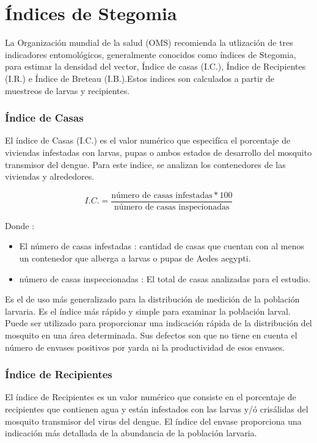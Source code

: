 \section{Índices de Stegomia}
\label{sec:densidad-vectorial-indices-stegomia}

La Organización mundial de la salud (OMS) recomienda la utlización de tres
indicadores entomológicos, generalmente conocidos como índices de Stegomia,
para estimar la densidad del vector, Índice de casas (I.C.), Índice de
Recipientes (I.R.) e Índice de Breteau (I.B.).Estos indices son calculados a
partir de muestreos de larvas y recipientes.

\subsubsection{Índice de Casas}
El índice de Casas (I.C.) es el valor numérico que especifíca el porcentaje
de viviendas infestadas con larvas, pupas o ambos estados de desarrollo
del mosquito transmisor del dengue. Para este indice, se analizan los
contenedores de las viviendas y alrededores.

\begin{equation}
I.C. = \frac{\text{número de casas infestadas} * 100}{\text{número de casas inspecionadas}}
\end{equation}

Donde :
\begin{itemize}
\item El número de casas infestadas : cantidad de casas que
cuentan con al menos un contenedor que alberga a larvas o pupas de Aedes
aegypti.
\item número de casas inspeccionadas : El total de casas analizadas para
el estudio.
\end{itemize}

Es el de uso más generalizado para la distribución de medición de
la población larvaria. Es el índice más rápido y simple para examinar la
población larval. Puede ser utilizado para proporcionar una indicación
rápida de la distribución del mosquito en una área determinada. Sus
defectos son que no tiene en cuenta el número de envases positivos por
yarda ni la productividad de esos envases.

\subsubsection{Índice de Recipientes}
El índice de Recipientes es un valor numérico que consiste en el
porcentaje de recipientes que contienen agua y están infestados con las
larvas y/ó crisálidas del mosquito transmisor del virus del dengue.
El índice del envase proporciona una indicación más detallada de la
abundancia de la población larvaria.

